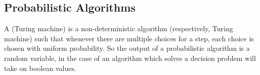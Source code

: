 \documentclass[10pt]{article}
\begin{document}


\bigskip

\subsection{Probabilistic Algorithms}

\begin{defn*}

    A  (Turing machine) is a non-deterministic algorithm (respectively, Turing machine) such that whenever there are multiple choices for a step, each choice is chosen with
    uniform probability.
    So the output of a probabilistic algorithm is a random variable, in the case of an algorithm which solves a decision problem will take on boolean values.

\end{defn*}
\end{document}
